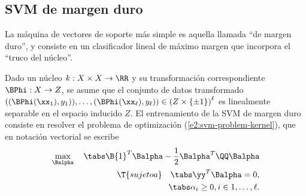 %
%
\subsection{SVM de margen duro}
%
La máquina de vectores de soporte más simple es aquella llamada ``de
margen duro'', y consiste en un clasificador lineal de máximo margen
que incorpora el ``truco del núcleo''.



Dado un núcleo $k:X\times{}X\rightarrow\RR$ y su transformación
correspondiente $\BPhi:X\rightarrow{}Z$, se asume que el conjunto de
datos transformado $\left((\BPhi(\xx_1),y_1)),\ldots,(\BPhi(\xx_\ell),y_\ell)\right)\in\left(Z\times\{\pm1\}\right)^\ell$
es linealmente separable en el espacio inducido $Z$. El entrenamiento de la SVM de margen duro
consiste en resolver el problema de optimización (\ref{e2:svm-problem-kernel}), que en
notación vectorial se escribe
%
\begin{align}
  \begin{split}
    \max_{\Balpha}\quad\tabs
      \B{1}^T\Balpha-\frac{1}{2}\Balpha^T\QQ\Balpha\\
    \T{sujeto a} \quad\tabs
      \yy^T\Balpha = 0, \\
      \tabs \alpha_i\geq 0,  i\in {1,\ldots,\ell }.
\end{split}
\end{align}









